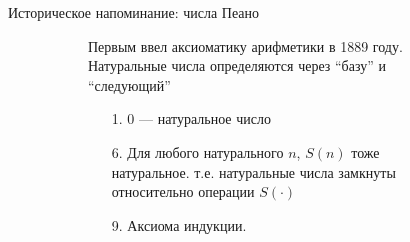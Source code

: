 \begin{frame}{Историческое напоминание: числа Пеано}
\begin{figure}[ht]
  \begin{subfigure}[t]{.55\textwidth}
  \vspace{-8em}
  Первым ввел аксиоматику арифметики в 1889 году. Натуральные числа определяются через ``базу'' и ``следующий''\\
  
  \begin{enumerate}
  \item[1.] 0 --- натуральное число
  \item[6.] Для любого натурального $n$, $S(n)$ тоже натуральное. т.е. натуральные числа замкнуты относительно операции $S(\cdot)$
  \item [9.] Аксиома индукции.
  \end{enumerate}
  

\end{subfigure}
\end{figure}
\end{frame}
